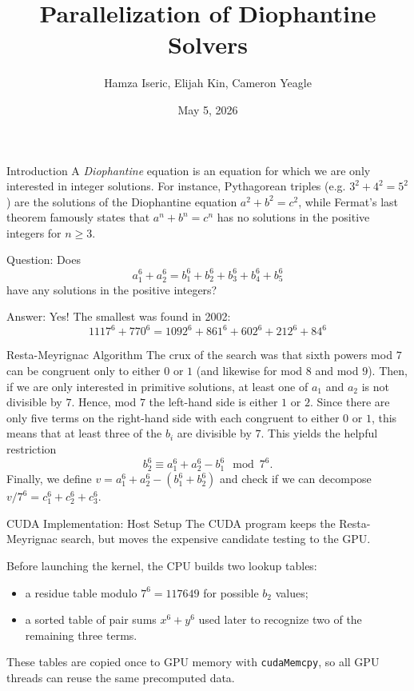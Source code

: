 \documentclass[]{beamer}
\title{Parallelization of Diophantine Solvers}
\author{Hamza Iseric, Elijah Kin, Cameron Yeagle}
\date{May 5, 2026}
\begin{document}
\begin{frame}
  \titlepage
\end{frame}

\begin{frame}{Introduction}
  A \emph{Diophantine} equation is an equation for which we are only interested in integer solutions.
  \pause
  For instance, Pythagorean triples (e.g. $3^2 + 4^2 = 5^2$) are the solutions of the Diophantine equation $a^2 + b^2 = c^2$, while Fermat's last theorem famously states that $a^n + b^n = c^n$ has no solutions in the positive integers for $n \geq 3$.
  \pause
  \bigskip

  Question: Does
  \begin{equation*}
    a_1^6 + a_2^6 = b_1^6 + b_2^6 + b_3^6 + b_4^6 + b_5^6
  \end{equation*}
  have any solutions in the positive integers?
  \pause
  \bigskip

  Answer: Yes! The smallest was found in 2002:
  \begin{equation*}
    1117^6 + 770^6 = 1092^6 + 861^6 + 602^6 + 212^6 + 84^6
  \end{equation*}
\end{frame}

\begin{frame}{Resta-Meyrignac Algorithm}
  The crux of the search was that sixth powers mod $7$ can be congruent only to either $0$ or $1$ (and likewise for mod $8$ and mod $9$).
  \pause
  Then, if we are only interested in primitive solutions, at least one of $a_1$ and $a_2$ is not divisible by $7$.
  \pause
  Hence, mod $7$ the left-hand side is either $1$ or $2$.
  \pause
  Since there are only five terms on the right-hand side with each congruent to either $0$ or $1$, this means that at least three of the $b_i$ are divisible by $7$.
  \pause
  This yields the helpful restriction
  \begin{equation*}
    b_2^6 \equiv a_1^6 + a_2^6 - b_1^6 \mod 7^6.
  \end{equation*}
  \pause
  Finally, we define $v = a_1^6 + a_2^6 - (b_1^6 + b_2^6)$ and check if we can decompose $v / 7^6 = c_1^6 + c_2^6 + c_3^6$.
\end{frame}

\begin{frame}{CUDA Implementation: Host Setup}
  The CUDA program keeps the Resta-Meyrignac search, but moves the expensive
  candidate testing to the GPU.
  \pause
  \bigskip

  Before launching the kernel, the CPU builds two lookup tables:
  \begin{itemize}
    \item a residue table modulo $7^6 = 117649$ for possible $b_2$ values;
    \item a sorted table of pair sums $x^6 + y^6$ used later to recognize
      two of the remaining three terms.
  \end{itemize}
  \pause

  These tables are copied once to GPU memory with \texttt{cudaMemcpy}, so all
  GPU threads can reuse the same precomputed data.
\end{frame}
\end{document}
